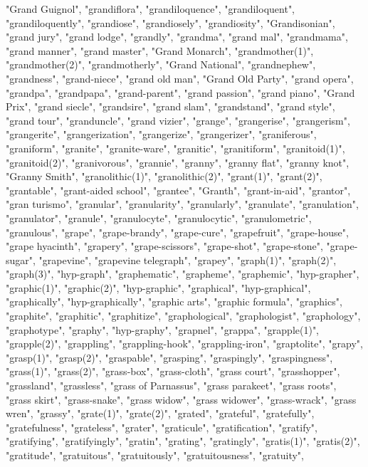 "Grand Guignol",
"grandiflora",
"grandiloquence",
"grandiloquent",
"grandiloquently",
"grandiose",
"grandiosely",
"grandiosity",
"Grandisonian",
"grand jury",
"grand lodge",
"grandly",
"grandma",
"grand mal",
"grandmama",
"grand manner",
"grand master",
"Grand Monarch",
"grandmother(1)",
"grandmother(2)",
"grandmotherly",
"Grand National",
"grandnephew",
"grandness",
"grand-niece",
"grand old man",
"Grand Old Party",
"grand opera",
"grandpa",
"grandpapa",
"grand-parent",
"grand passion",
"grand piano",
"Grand Prix",
"grand siecle",
"grandsire",
"grand slam",
"grandstand",
"grand style",
"grand tour",
"granduncle",
"grand vizier",
"grange",
"grangerise",
"grangerism",
"grangerite",
"grangerization",
"grangerize",
"grangerizer",
"graniferous",
"graniform",
"granite",
"granite-ware",
"granitic",
"granitiform",
"granitoid(1)",
"granitoid(2)",
"granivorous",
"grannie",
"granny",
"granny flat",
"granny knot",
"Granny Smith",
"granolithic(1)",
"granolithic(2)",
"grant(1)",
"grant(2)",
"grantable",
"grant-aided school",
"grantee",
"Granth",
"grant-in-aid",
"grantor",
"gran turismo",
"granular",
"granularity",
"granularly",
"granulate",
"granulation",
"granulator",
"granule",
"granulocyte",
"granulocytic",
"granulometric",
"granulous",
"grape",
"grape-brandy",
"grape-cure",
"grapefruit",
"grape-house",
"grape hyacinth",
"grapery",
"grape-scissors",
"grape-shot",
"grape-stone",
"grape-sugar",
"grapevine",
"grapevine telegraph",
"grapey",
"graph(1)",
"graph(2)",
"graph(3)",
"hyp-graph",
"graphematic",
"grapheme",
"graphemic",
"hyp-grapher",
"graphic(1)",
"graphic(2)",
"hyp-graphic",
"graphical",
"hyp-graphical",
"graphically",
"hyp-graphically",
"graphic arts",
"graphic formula",
"graphics",
"graphite",
"graphitic",
"graphitize",
"graphological",
"graphologist",
"graphology",
"graphotype",
"graphy",
"hyp-graphy",
"grapnel",
"grappa",
"grapple(1)",
"grapple(2)",
"grappling",
"grappling-hook",
"grappling-iron",
"graptolite",
"grapy",
"grasp(1)",
"grasp(2)",
"graspable",
"grasping",
"graspingly",
"graspingness",
"grass(1)",
"grass(2)",
"grass-box",
"grass-cloth",
"grass court",
"grasshopper",
"grassland",
"grassless",
"grass of Parnassus",
"grass parakeet",
"grass roots",
"grass skirt",
"grass-snake",
"grass widow",
"grass widower",
"grass-wrack",
"grass wren",
"grassy",
"grate(1)",
"grate(2)",
"grated",
"grateful",
"gratefully",
"gratefulness",
"grateless",
"grater",
"graticule",
"gratification",
"gratify",
"gratifying",
"gratifyingly",
"gratin",
"grating",
"gratingly",
"gratis(1)",
"gratis(2)",
"gratitude",
"gratuitous",
"gratuitously",
"gratuitousness",
"gratuity",
